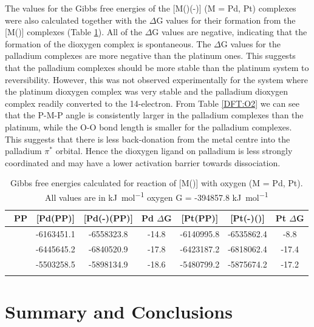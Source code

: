 The values for the Gibbs free energies of the [M(\tBuxantphos)(\hapto{}-)] (M = Pd, Pt) complexes were also calculated together with the $\Delta$G values for their formation from the [M(\tBuxantphos)] complexes (Table \ref{DFT:O2energy}).  All of the $\Delta$G values are negative, indicating that the formation of the dioxygen complex is spontaneous.  The $\Delta$G values for the palladium complexes are more negative than the platinum ones.  This suggests that the palladium complexes should be more stable than the platinum system to reversibility.  However, this was not observed experimentally for the \tButhixantphos{} system where the platinum dioxygen complex was very stable and the palladium dioxygen complex readily converted to the 14-electron.  From Table \ref{DFT:O2} we can see that the P-M-P angle is consistently larger in the palladium complexes than the platinum, while the O-O bond length is smaller for the palladium complexes.  This suggests that there is less back-donation from the metal centre into the palladium $\pi^*$ orbital.  Hence the dioxygen ligand on palladium is less strongly coordinated and may have a lower activation barrier towards dissociation.  

\begin{table}
\caption[Gibbs free energies calculated for the formation of [M(\tBuxantphos)(-){]}]{Gibbs free energies calculated for reaction of [M(\tBuxantphos)] with oxygen (M = Pd, Pt).  All values are in \si{\kilo\joule\per\mole} oxygen G = -394857.8 \si{\kilo\joule\per\mole}}
\vspace{1em}
\label{DFT:O2energy}
\small
\begin{center}
\begin{tabular}{l c c c c c c}
	\toprule
	~\bfseries{PP} & {[}Pd(PP)] & {[}Pd(\hapto{}-\ce{O2})(PP)] & Pd $\Delta$G & {[}Pt(PP)] & {[}Pt(\hapto{}-\ce{O2})(\tBuxantphos)] & Pt $\Delta$G \\
	\midrule		
	~\tBuSixantphos	& -6163451.1	& -6558323.8 & -14.8 & -6140995.8 & -6535862.4 & -8.8 \\
	~\tBuThixantphos	& -6445645.2	& -6840520.9 & -17.8 & -6423187.2 & -6818062.4 & -17.4 \\
	~\tBuXantphos{}	& -5503258.5	& -5898134.9 & -18.6 & -5480799.2 & -5875674.2 & -17.2 \\
	\bottomrule{}
\end{tabular}
\end{center}
\end{table}


\section{Summary and Conclusions}


